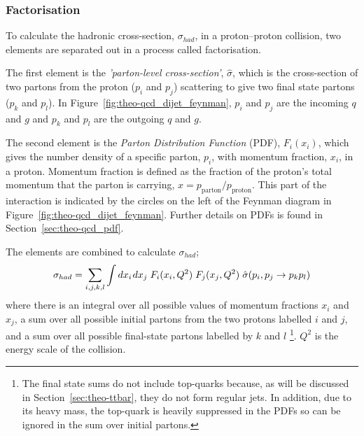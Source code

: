 \subsubsection{Factorisation}

To calculate the hadronic cross-section, $\sigma_{had}$, in a proton--proton collision,
two elements are separated out in a process called factorisation.

The first element is the \textit{'parton-level cross-section'}, $\hat{\sigma}$, which is the cross-section of
two partons from the proton ($p_i$ and $p_j$) scattering to give two final state partons ($p_k$ and $p_l$).
In Figure~\ref{fig:theo-qcd_dijet_feynman}, $p_i$ and $p_j$ are the incoming $q$ and $g$ and $p_k$ and $p_l$ are the outgoing $q$ and $g$.

The second element is the  \textit{Parton Distribution Function} (PDF), $F_i(x_i)$,
which gives the number density of a specific parton, $p_i$, with momentum fraction, $x_i$, in a proton.
Momentum fraction is defined as the fraction of the proton's total momentum that the parton is carrying, $x = p_{\text{parton}}/p_{\text{proton}}$.
This part of the interaction is indicated by the circles on the left of the Feynman diagram in Figure~\ref{fig:theo-qcd_dijet_feynman}.
Further details on PDFs is found in Section~\ref{sec:theo-qcd_pdf}.

The elements are combined to calculate $\sigma_{had}$;
\begin{equation}
  \sigma_{had} = \sum_{i,j,k,l} \int dx_i\hspace{0.3mm} dx_j \hspace{1mm} F_i(x_i,Q^2)\hspace{1mm}F_j(x_j,Q^2)\hspace{1mm}\hat{\sigma}(p_i, p_j\to p_k p_l)
\end{equation}
where there is an integral over all possible values of momentum fractions $x_i$ and $x_j$,
a sum over all possible initial partons from the two protons labelled $i$ and $j$,
and a sum over all possible final-state partons labelled by $k$ and $l$
\footnote{The final state sums do not include top-quarks because, as will be discussed in Section~\ref{sec:theo-ttbar}, they do not form regular jets. 
  In addition, due to its heavy mass, the top-quark is heavily suppressed in the PDFs so can be ignored in the sum over initial partons.}.
$Q^2$ is the energy scale of the collision.

